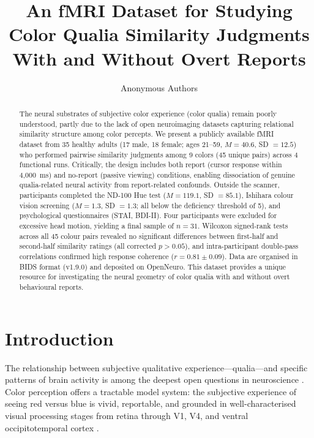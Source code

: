 \documentclass[11pt]{article}
\title{An fMRI Dataset for Studying Color Qualia Similarity Judgments With and Without Overt Reports}
\author{Anonymous Authors}
\date{}
\begin{document}
\maketitle

\begin{abstract}
The neural substrates of subjective color experience (color qualia) remain poorly understood, partly due to the lack of open neuroimaging datasets capturing relational similarity structure among color percepts. We present a publicly available fMRI dataset from 35 healthy adults (17 male, 18 female; ages 21--59, $M = 40.6$, SD $= 12.5$) who performed pairwise similarity judgments among 9 colors (45 unique pairs) across 4 functional runs. Critically, the design includes both report (cursor response within 4,000~ms) and no-report (passive viewing) conditions, enabling dissociation of genuine qualia-related neural activity from report-related confounds. Outside the scanner, participants completed the ND-100 Hue test ($M = 119.1$, SD $= 85.1$), Ishihara colour vision screening ($M = 1.3$, SD $= 1.3$; all below the deficiency threshold of 5), and psychological questionnaires (STAI, BDI-II). Four participants were excluded for excessive head motion, yielding a final sample of $n = 31$. Wilcoxon signed-rank tests across all 45 colour pairs revealed no significant differences between first-half and second-half similarity ratings (all corrected $p > 0.05$), and intra-participant double-pass correlations confirmed high response coherence ($r = 0.81 \pm 0.09$). Data are organised in BIDS format (v1.9.0) and deposited on OpenNeuro. This dataset provides a unique resource for investigating the neural geometry of color qualia with and without overt behavioural reports.
\end{abstract}

\section{Introduction}

The relationship between subjective qualitative experience---qualia---and specific patterns of brain activity is among the deepest open questions in neuroscience \citep{chalmers1995facing, koch2016neural}. Color perception offers a tractable model system: the subjective experience of seeing red versus blue is vivid, reportable, and grounded in well-characterised visual processing stages from retina through V1, V4, and ventral occipitotemporal cortex \citep{zeki1973colour, bartels2000architecture, hadjikhani1998retinotopy, conway2010advances}.
\end{document}
